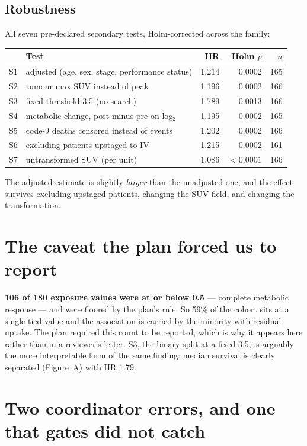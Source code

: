 \documentclass[11pt,a4paper]{article}
\begin{document}
\subsection{Robustness}

All seven pre-declared secondary tests, Holm-corrected across the family:

\begin{center}
\begin{tabular}{@{}llrrr@{}}
\toprule
& \textbf{Test} & \textbf{HR} & \textbf{Holm $p$} & \textbf{$n$} \\
\midrule
S1 & adjusted (age, sex, stage, performance status) & 1.214 & 0.0002 & 165 \\
S2 & tumour max SUV instead of peak & 1.196 & 0.0002 & 166 \\
S3 & fixed threshold 3.5 (no search) & 1.789 & 0.0013 & 166 \\
S4 & metabolic change, post minus pre on log$_2$ & 1.195 & 0.0002 & 165 \\
S5 & code-9 deaths censored instead of events & 1.202 & 0.0002 & 166 \\
S6 & excluding patients upstaged to IV & 1.215 & 0.0002 & 161 \\
S7 & untransformed SUV (per unit) & 1.086 & $<0.0001$ & 166 \\
\bottomrule
\end{tabular}
\end{center}

The adjusted estimate is slightly \emph{larger} than the unadjusted one, and the effect survives
excluding upstaged patients, changing the SUV field, and changing the transformation.

\section{The caveat the plan forced us to report}

\textbf{106 of 180 exposure values were at or below 0.5} --- complete metabolic response ---
and were floored by the plan's rule. So 59\% of the cohort sits at a single tied value and the
association is carried by the minority with residual uptake. The plan required this count to be
reported, which is why it appears here rather than in a reviewer's letter. S3, the binary split at
a fixed 3.5, is arguably the more interpretable form of the same finding: median survival is
clearly separated (Figure~A) with HR 1.79.

\section{Two coordinator errors, and one that gates did not catch}
\end{document}
